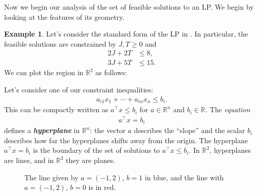 \documentclass[a4paper, 12pt]{article}
\numberwithin{equation}{section}
\numberwithin{figure}{section}
\theoremstyle{definition}
\newtheorem{ex}[thm]{Example}
\renewcommand{\leq}{\leqslant}
\renewcommand{\geq}{\geqslant}
\newcommand{\R}{\mathbb{R}}
\newcommand{\define}[1]{\textbf{\textit{#1}}}
\begin{document}
Now we begin our analysis of the set of feasible solutions to an LP. We begin by
looking at the features of its geometry.

\begin{ex}\label{ex:sewing-feasible}
	Let's consider the standard form of the LP in . In
	particular, the feasible solutions are constrained by $J,T \geq 0$ and 
	\begin{align*}
		2J + 2T &\leq 8, \\
		3J + 5T &\leq 15.
	\end{align*}
	We can plot the region in $\R^2$ as follows:
	\begin{center}
	\end{center}
\end{ex}

Let's consider one of our constraint inequalities:
\begin{align*}
	a_{i1}x_1 + \cdots + a_{in}x_n \leq b_i.
\end{align*}
This can be compactly written as $a^{\top}x \leq b_i$ for $a\in\R^n$ and $b_i\in
\R$. The \emph{equation} 
\begin{align*}
	a^{\top}x = b_i 
\end{align*}
defines a \define{hyperplane} in $\R^n$: the vector $a$ describes the ``slope''
and the scalar $b_i$ describes how far the hyperplanes shifts away from the
origin. The hyperplane $a^{\top}x = b_i$ is the boundary of the set of solutions
to $a^{\top}x \leq b_i$. In $\R^2$, hyperplanes are lines, and in $\R^3$ they
are planes. 

\begin{figure}[h]
	\centering 
	\caption{The line given by $a = (-1, 2)$, $b=1$ in blue, and the line with $a = (-1, 2)$, $b=0$ is in red.}
\end{figure}
\end{document}
